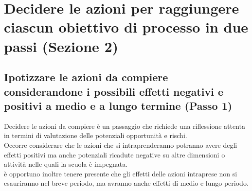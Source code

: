 \documentclass[12pt,a4paper,oneside]{memoir}
\begin{document}
\section[Sezione 2. Azioni per raggiungere ciascun obiettivo]{Decidere le azioni per raggiungere ciascun obiettivo di processo in due passi (Sezione 2)}

\subsection[Passo 1. Ipotizzare le azioni da compiere]{Ipotizzare le azioni da compiere considerandone i possibili effetti negativi e positivi a medio e a lungo termine (Passo 1)}

Decidere le azioni da compiere è un passaggio che richiede una riflessione attenta in termini di valutazione delle potenziali opportunità e rischi.\\
Occorre considerare che le azioni che si intraprenderanno potranno avere degli effetti positivi ma anche potenziali ricadute negative su altre dimensioni o attività nelle quali la scuola è impegnata.\\
è opportuno inoltre tenere presente che gli effetti delle azioni intraprese non si esauriranno nel breve periodo, ma avranno anche effetti di medio e lungo periodo.\\


\begin{center}
\end{center}
\end{document}
